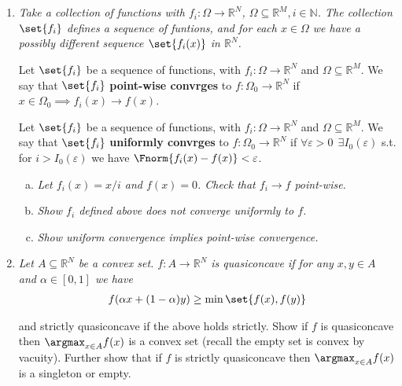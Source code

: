 \documentclass{article}
\begin{document}
\displayoptions

\section{}

\begin{enumerate}[1.]
  \item {\itshape
    Take a collection of functions with $f_i: \Omega \to \mathbb{R}^N$, $\Omega \subseteq \mathbb{R}^M, i \in \mathbb{N}$. The collection $\set{f_i}$ defines a sequence of funtions, and for each $x \in \Omega$ we have a possibly different sequence $\set{f_i(x)}$ in $\mathbb{R}^N$.

    Let $\set{f_i}$ be a sequence of functions, with $f_i: \Omega \to \mathbb{R}^N$ and $\Omega \subseteq \mathbb{R}^M$. We say that $\set{f_i}$ \textbf{point-wise convrges} to $f: \Omega_0 \to \mathbb{R}^N$ if $x \in \Omega_0 \implies f_i(x) \to f(x)$.

    Let $\set{f_i}$ be a sequence of functions, with $f_i: \Omega \to \mathbb{R}^N$ and $\Omega \subseteq \mathbb{R}^M$. We say that $\set{f_i}$ \textbf{uniformly convrges} to $f: \Omega_0 \to \mathbb{R}^N$ if $\forall \varepsilon > 0 ~~ \exists I_0(\varepsilon)$ s.t. for $i > I_0(\varepsilon)$ we have $\Fnorm{f_i(x) - f(x)} < \varepsilon$.

    \begin{enumerate}[a)]
      \item \textit{Let $f_i(x) = x / i$ and $f(x) = 0$. Check that $f_i \to f$ point-wise.}
      \item \textit{Show $f_i$ defined above does not converge uniformly to $f$.}
      \item \textit{Show uniform convergence implies point-wise convergence.}
    \end{enumerate}
  }

  \item {\itshape Let $A \subseteq \mathbb{R}^N$ be a convex set. $f: A \to \mathbb{R}^N$ is quasiconcave if for any $x, y \in A$ and $\alpha \in [0, 1]$ we have
      \begin{align*}
        f(\alpha x + (1 - \alpha) y) \ge \min\set{f(x), f(y)}
      \end{align*}

    and strictly quasiconcave if the above holds strictly. Show if $f$ is quasiconcave then $\argmax_{x \in A} f(x)$ is a convex set (recall the empty set is convex by vacuity). Further show that if $f$ is strictly quasiconcave then $\argmax_{x \in A} f(x)$ is a singleton or empty.}


\end{enumerate}
\end{document}
